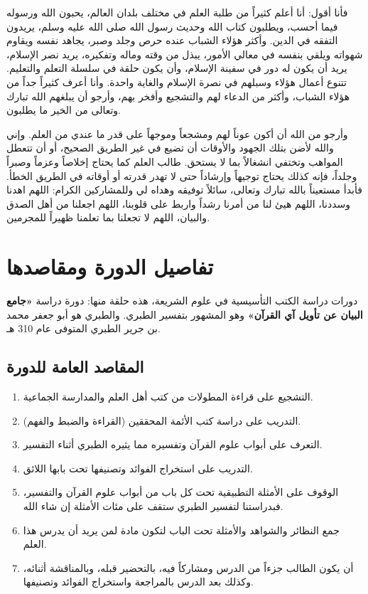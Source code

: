 فأنا أقول: أنا أعلم كثيراً من طلبة العلم في مختلف بلدان العالم، يحبون الله ورسوله فيما أحسب، ويطلبون كتاب الله وحديث رسول الله صلى الله عليه وسلم، يريدون التفقه في الدين. وأكثر هؤلاء الشباب عنده حرص وجلد وصبر، يجاهد نفسه ويقاوم شهواته ويلقي بنفسه في معالي الأمور، يبذل من وقته وماله وتفكيره، يريد نصر الإسلام، يريد أن يكون له دور في سفينة الإسلام، وأن يكون حلقة في سلسلة التعلم والتعليم. تتنوع أعمال هؤلاء وسبلهم في نصرة الإسلام والغاية واحدة. وأنا أعرف كثيراً جداً من هؤلاء الشباب، وأكثر من الدعاء لهم والتشجيع وأفخر بهم، وأرجو أن يبلغهم الله تبارك وتعالى من الخير ما يطلبون.

وأرجو من الله أن أكون عوناً لهم ومشجعاً وموجهاً على قدر ما عندي من العلم. وإني والله لأضن بتلك الجهود والأوقات أن تضيع في غير الطريق الصحيح، أو أن تتعطل المواهب وتختفي انشغالاً بما لا يستحق. طالب العلم كما يحتاج إخلاصاً وعزماً وصبراً وجلداً، فإنه كذلك يحتاج توجيهاً وإرشاداً حتى لا تهدر قدرته أو أوقاته في الطريق الخطأ. فأبدأ مستعيناً بالله تبارك وتعالى، سائلاً توفيقه وهداه لي وللمشاركين الكرام: اللهم اهدنا وسددنا، اللهم هيئ لنا من أمرنا رشداً واربط على قلوبنا، اللهم اجعلنا من أهل الصدق والبيان، اللهم لا تجعلنا بما تعلمنا ظهيراً للمجرمين.

\section*{تفاصيل الدورة ومقاصدها}
دورات دراسة الكتب التأسيسية في علوم الشريعة، هذه حلقة منها: دورة دراسة \textbf{«جامع البيان عن تأويل آي القرآن»} وهو المشهور بتفسير الطبري. والطبري هو أبو جعفر محمد بن جرير الطبري المتوفى عام 310 هـ.

\subsection*{المقاصد العامة للدورة}
\begin{enumerate}
    \item التشجيع على قراءة المطولات من كتب أهل العلم والمدارسة الجماعية.
    \item التدريب على دراسة كتب الأئمة المحققين (القراءة والضبط والفهم).
    \item التعرف على أبواب علوم القرآن وتفسيره مما يثيره الطبري أثناء التفسير.
    \item التدريب على استخراج الفوائد وتصنيفها تحت بابها اللائق.
    \item الوقوف على الأمثلة التطبيقية تحت كل باب من أبواب علوم القرآن والتفسير، فبدراستنا لتفسير الطبري ستقف على مئات الأمثلة إن شاء الله.
    \item جمع النظائر والشواهد والأمثلة تحت الباب لتكون مادة لمن يريد أن يدرس هذا العلم.
    \item أن يكون الطالب جزءاً من الدرس ومشاركاً فيه، بالتحضير قبله، وبالمناقشة أثنائه، وكذلك بعد الدرس بالمراجعة واستخراج الفوائد وتصنيفها.
\end{enumerate}

